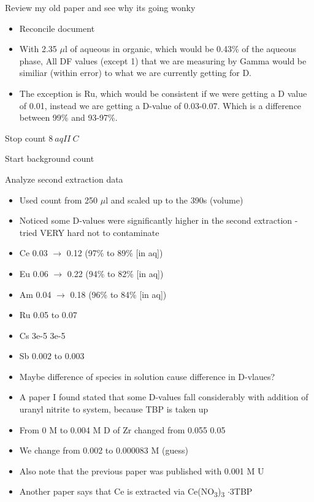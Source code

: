 \documentclass[idxtotoc,hyperref,openany,oneside]{labbook} %
\newcommand{\cmark}{\ding{51}}%
\newcommand{\done}{\rlap{$\square$}{\raisebox{2pt}{\large\hspace{1pt}\cmark}}%
  \hspace{-2.5pt}}
\newcommand{\tsbs}{\textsubscript}
\begin{document}
\begin{todolist}
  \item[\done]{Review my old paper and see why its going wonky}
    \begin{itemize}
    \item{Reconcile document}
    \item{With 2.35 $\mu$l of aqueous in organic, which would be
      0.43\% of the aqueous phase, All DF values (except 1) that we are
      measuring by Gamma would be similiar (within error) to
      what we are currently getting for D.}
    \item{The exception is Ru, which would be consistent if we
      were getting a D value of 0.01, instead we are getting a D-value
      of 0.03-0.07. Which is a difference between 99\% and
      93-97\%.}
    \end{itemize}
\end{todolist}

\begin{todolist}
\item[\done]{Stop count $\boxed{8\ aqII\ C}$}
\item[\done]{Start background count}
\item[\done]{Analyze second extraction data}
  \begin{itemize}
  \item{Used count from 250 $\mu$l and scaled up to the 390s (volume)}
  \item{Noticed some D-values were significantly higher
    in the second extraction - tried VERY hard not to contaminate}
  \item{Ce 0.03 $\rightarrow$ 0.12  (97\% to 89\% [in aq])}
  \item{Eu 0.06 $\rightarrow$ 0.22  (94\% to 82\% [in aq])}
  \item{Am 0.04 $\rightarrow$ 0.18  (96\% to 84\% [in aq])}
  \item{Ru 0.05 to 0.07}
  \item{Cs 3e-5 3e-5}
  \item{Sb 0.002 to 0.003}
  \end{itemize}
  \begin{itemize}
  \item{Maybe difference of species in solution cause
    difference in D-vlaues?}
  \item{A paper I found stated that some D-values fall considerably
    with addition of uranyl nitrite to system, because TBP is
    taken up}
  \item{From 0 M to 0.004 M D of Zr changed from 0.055 0.05}
  \item{We change from 0.002 to 0.000083 M (guess)}
  \item{Also note that the previous paper was published with
    0.001 M U}
  \item{Another paper says that Ce is extracted via Ce(NO\tsbs{3})\tsbs{3}
    $\cdot$3TBP}
  \end{itemize}
\end{todolist}
\end{document}
